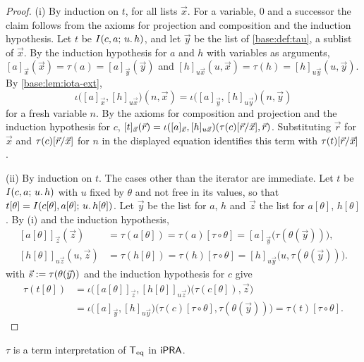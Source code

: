 \begin{proof}
(i) By induction on $t$, for all lists $\vec x$.  For a variable, $0$ and a
successor the claim follows from the axioms for projection and composition
and the induction hypothesis.  Let $t$ be $I(c,a;\,u.\,h)$, and let
$\vec y$ be the list of \cref{base:def:tau}, a sublist of $\vec x$.  By the
induction hypothesis for $a$ and $h$ with variables as arguments,
$[a]_{\vec x}(\vec x)=\tau(a)=[a]_{\vec y}(\vec y)$ and
$[h]_{u\vec x}(u,\vec x)=\tau(h)=[h]_{u\vec y}(u,\vec y)$.  By
\cref{base:lem:iota-ext},
\[
 \iota\bigl([a]_{\vec x},[h]_{u\vec x}\bigr)(n,\vec x)
 =\iota\bigl([a]_{\vec y},[h]_{u\vec y}\bigr)(n,\vec y)
\]
for a fresh variable $n$.  By the axioms for composition and projection and
the induction hypothesis for $c$,
$[t]_{\vec x}(\vec r)
 =\iota([a]_{\vec x},[h]_{u\vec x})(\tau(c)[\vec r/\vec x],\vec r)$.
Substituting $\vec r$ for $\vec x$ and $\tau(c)[\vec r/\vec x]$ for
$n$ in the displayed equation identifies this term with
$\tau(t)[\vec r/\vec x]$.

(ii) By induction on $t$.  The cases other than the iterator are immediate.
Let $t$ be $I(c,a;\,u.\,h)$ with $u$ fixed by $\theta$ and not free in its
values, so that $t[\theta]=I(c[\theta],a[\theta];\,u.\,h[\theta])$.  Let
$\vec y$ be the list for $a$, $h$ and $\vec z$ the list for $a[\theta]$,
$h[\theta]$.  By (i) and the induction hypothesis,
\begin{align*}
 {}[a[\theta]]_{\vec z}(\vec z)&=\tau(a[\theta])=\tau(a)[\tau\circ\theta]
   =[a]_{\vec y}\bigl(\tau(\theta(\vec y))\bigr),\\
 {}[h[\theta]]_{u\vec z}(u,\vec z)&=\tau(h[\theta])=\tau(h)[\tau\circ\theta]
   =[h]_{u\vec y}\bigl(u,\tau(\theta(\vec y))\bigr).
\end{align*}
 with $\vec s\mathrel{:=}\tau(\theta(\vec y))$ and the
induction hypothesis for $c$ give
\begin{align*}
 \tau(t[\theta])
 &=\iota\bigl([a[\theta]]_{\vec z},[h[\theta]]_{u\vec z}\bigr)
   \bigl(\tau(c[\theta]),\vec z\bigr)\\
 &=\iota\bigl([a]_{\vec y},[h]_{u\vec y}\bigr)
   \bigl(\tau(c)[\tau\circ\theta],\tau(\theta(\vec y))\bigr)
  =\tau(t)[\tau\circ\theta].
\end{align*}
\end{proof}

\begin{proposition}
\label{base:prop:tau}
$\tau$ is a term interpretation of $\mathsf{T}_{\mathrm{eq}}$ in $\mathsf{iPRA}$.
\end{proposition}

